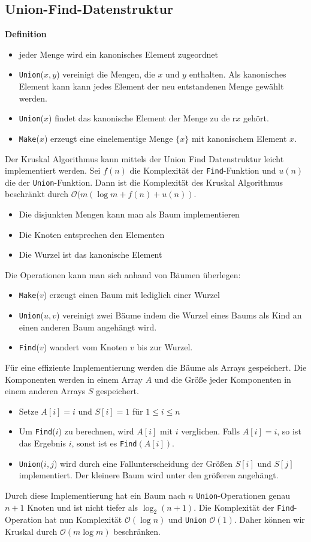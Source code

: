 \documentclass[a4paper, 12pt]{article}
\begin{document}
	\subsection{Union-Find-Datenstruktur}
	\textbf{Definition}
	\begin{itemize}
		\item jeder Menge wird ein kanonisches Element zugeordnet
		\item \texttt{Union}($x,y$) vereinigt die Mengen, die $x$ und $y$ enthalten. Als kanonisches Element kann kann jedes Element der neu entstandenen Menge gewählt werden.
		\item \texttt{Union}($x$) findet das kanonische Element der Menge zu de r$x$ gehört.
		\item \texttt{Make}($x$) erzeugt eine einelementige Menge $\{x\}$ mit kanonischem Element $x$.
	\end{itemize}
	Der Kruskal Algorithmus kann mittels der Union Find Datenstruktur leicht implementiert werden. Sei $f(n)$ die Komplexität der \texttt{Find}-Funktion und $u(n)$ die der \texttt{Union}-Funktion. Dann ist die Komplexität des Kruskal Algorithmus beschränkt durch $\mathcal{O}(m(\log m + f(n) + u(n))$. \begin{itemize}
		\item Die disjunkten Mengen kann man als Baum implementieren
		\item Die Knoten entsprechen den Elementen
		\item Die Wurzel ist das kanonische Element
	\end{itemize}
	Die Operationen kann man sich anhand von Bäumen überlegen:\begin{itemize}
		\item \texttt{Make}($v$) erzeugt einen Baum mit lediglich einer Wurzel
		\item \texttt{Union}($u,v$) vereinigt zwei Bäume indem die Wurzel eines Baums als Kind an einen anderen Baum angehängt wird.
		\item \texttt{Find}($v$) wandert vom Knoten $v$ bis zur Wurzel.
	\end{itemize}
	Für eine effiziente Implementierung werden die Bäume als Arrays gespeichert. Die Komponenten werden in einem Array $A$ und die Größe jeder Komponenten in einem anderen Arrays $S$ gespeichert. \begin{itemize}
		\item Setze $A[i] = i$ und $S[i] = 1$ für $1 \leq i \leq n$
		\item Um \texttt{Find}($i$) zu berechnen, wird $A[i]$ mit $i$ verglichen. Falls $A[i]=i$, so ist das Ergebnis $i$, sonst ist es \texttt{Find}$(A[i])$.
		\item \texttt{Union}($i,j$) wird durch eine Fallunterscheidung der Größen $S[i]$ und $S[j]$ implementiert. Der kleinere Baum wird unter den größeren angehängt.
	\end{itemize}
	Durch diese Implementierung hat ein Baum nach $n$ \texttt{Union}-Operationen genau $n+1$ Knoten und ist nicht tiefer als $\log_2(n+1)$. Die Komplexität der \texttt{Find}-Operation hat nun Komplexität $\mathcal{O}(\log n)$ und \texttt{Union} $\mathcal{O}(1)$. Daher können wir Kruskal durch $\mathcal{O}(m\log m)$ beschränken.\\
	
\end{document}
